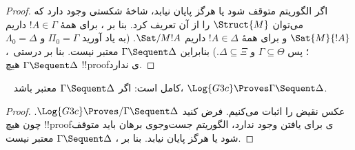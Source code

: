 \documentclass[../../../include/open-logic-section]{subfiles}
\begin{document}
\begin{proof}
  اگر الگوریتم متوقف شود یا هرگز پایان نیابد، شاخهٔ شکستی وجود دارد که
  می‌توان $\Struct{M}$ را از آن تعریف کرد. بنا بر ،
  برای همهٔ $!A \in \Gamma$ داریم $\Sat{M}{!A}$ و برای همهٔ
  $!A \in \Delta$ داریم $\Sat/{M}{!A}$. (به یاد آورید
  $\Pi_0 = \Gamma$ و $\Lambda_0 = \Delta$؛ پس
  $\Gamma \subseteq \Theta$ و $\Delta \subseteq \Xi$.) بنابراین
  $\Gamma \Sequent \Delta$ معتبر نیست. بنا بر درستی~،
  $\Gamma \Sequent \Delta$ هیچ !!{proof}ی ندارد.
\end{proof}

\begin{cor}
~ کامل است: اگر $\Gamma \Sequent \Delta$ معتبر باشد،
$\Log{G3c} \Proves \Gamma \Sequent \Delta$.
\end{cor}

\begin{proof}
  عکس نقیض را اثبات می‌کنیم. فرض کنید
  $\Log{G3c} \Proves/ \Gamma \Sequent \Delta$. چون هیچ !!{proof}ی
  برای یافتن وجود ندارد، الگوریتم جست‌وجوی برهان باید متوقف شود یا
  هرگز پایان نیابد. بنا بر ،
  $\Gamma \Sequent \Delta$ معتبر نیست.
\end{proof}
\end{document}
